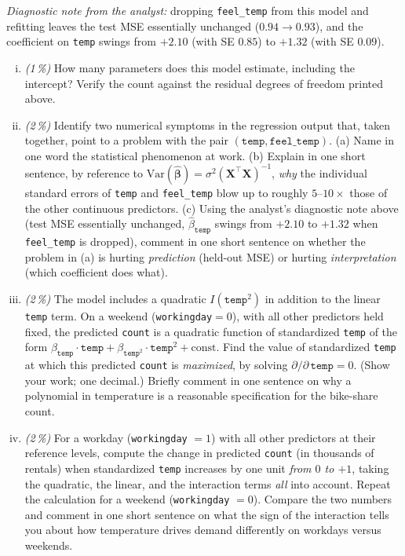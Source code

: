 \documentclass[11pt,a4paper]{article}
\newcommand{\subpoints}[1]{\textit{(#1\,\%)}}
\begin{document}
\medskip
\noindent\textit{Diagnostic note from the analyst:} dropping \texttt{feel\_temp} from this model and refitting leaves the test MSE essentially unchanged ($0.94 \to 0.93$), and the coefficient on \texttt{temp} swings from $+2.10$ (with SE $0.85$) to $+1.32$ (with SE $0.09$).

\begin{enumerate}[(i)]
  \item \subpoints{1} How many parameters does this model estimate, including the intercept? Verify the count against the residual degrees of freedom printed above.

  \item \subpoints{2} Identify two numerical symptoms in the regression output that, taken together, point to a problem with the pair $(\texttt{temp}, \texttt{feel\_temp})$. (a) Name in one word the statistical phenomenon at work. (b) Explain in one short sentence, by reference to $\mathrm{Var}(\hat{\boldsymbol\beta}) = \sigma^2 (\mathbf X^\top \mathbf X)^{-1}$, \emph{why} the individual standard errors of \texttt{temp} and \texttt{feel\_temp} blow up to roughly $5$--$10\times$ those of the other continuous predictors. (c) Using the analyst's diagnostic note above (test MSE essentially unchanged, $\hat\beta_{\texttt{temp}}$ swings from $+2.10$ to $+1.32$ when \texttt{feel\_temp} is dropped), comment in one short sentence on whether the problem in (a) is hurting \emph{prediction} (held-out MSE) or hurting \emph{interpretation} (which coefficient does what).

  \item \subpoints{2} The model includes a quadratic $I(\texttt{temp}^2)$ in addition to the linear \texttt{temp} term. On a weekend (\texttt{workingday}$=0$), with all other predictors held fixed, the predicted \texttt{count} is a quadratic function of standardized \texttt{temp} of the form $\beta_{\texttt{temp}}\cdot \texttt{temp} + \beta_{\texttt{temp}^2}\cdot \texttt{temp}^2 + \text{const}$. Find the value of standardized \texttt{temp} at which this predicted \texttt{count} is \emph{maximized}, by solving $\partial/\partial\,\texttt{temp} = 0$. (Show your work; one decimal.) Briefly comment in one sentence on why a polynomial in temperature is a reasonable specification for the bike-share count.

  \item \subpoints{2} For a workday (\texttt{workingday} $= 1$) with all other predictors at their reference levels, compute the change in predicted \texttt{count} (in thousands of rentals) when standardized \texttt{temp} increases by one unit \emph{from $0$ to $+1$}, taking the quadratic, the linear, and the interaction terms \emph{all} into account. Repeat the calculation for a weekend (\texttt{workingday} $= 0$). Compare the two numbers and comment in one short sentence on what the sign of the interaction tells you about how temperature drives demand differently on workdays versus weekends.


\end{enumerate}
\end{document}
